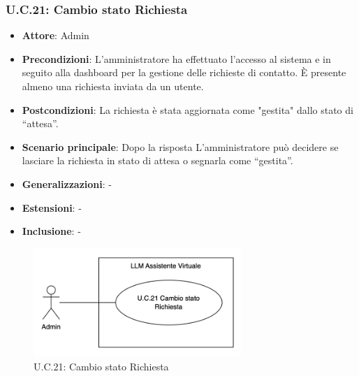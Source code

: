 \subsubsection{U.C.21: Cambio stato Richiesta}
\begin{itemize}
    \item \textbf{Attore}: Admin
    \item \textbf{Precondizioni}: L’amministratore ha effettuato l’accesso al sistema e in seguito alla dashboard per la gestione delle richieste di contatto. È presente almeno una richiesta inviata da un utente.
    \item \textbf{Postcondizioni}: La richiesta è stata aggiornata come "gestita" dallo stato di “attesa”.
    \item \textbf{Scenario principale}: Dopo la risposta L’amministratore può decidere se lasciare la richiesta in stato di attesa o segnarla come “gestita”.
    \item \textbf{Generalizzazioni}: -
    \item \textbf{Estensioni}: -
    \item \textbf{Inclusione}: -
\end{itemize}
\begin{figure}[H]
    \centering
    \includegraphics[width=0.7\textwidth]{img/UC21.png}
    \caption{U.C.21: Cambio stato Richiesta}
\end{figure}
\newpage

